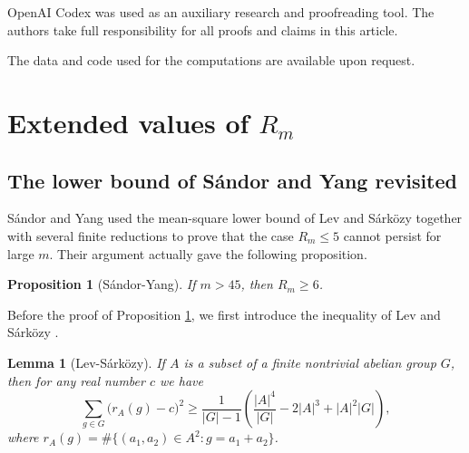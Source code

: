 \documentclass[12pt,a4paper,reqno]{amsart}
\numberwithin{equation}{section}
\theoremstyle{plain}
\newtheorem{lemma}{Lemma}
\newtheorem{proposition}{Proposition}
\theoremstyle{definition}
\begin{document}
OpenAI Codex was used as an auxiliary research and proofreading tool. 
The authors take full responsibility for all proofs and claims in this article.

The data and code used for the computations are available upon request. 

\section{Extended values of \texorpdfstring{$R_m$}{Rm}}

\subsection{The lower bound of S\'andor and Yang revisited}
S\'andor and Yang \cite{SY17} used the mean-square lower bound of
Lev and S\'ark\"ozy \cite{LevSarkozy} together with several finite
reductions to prove that the case \(R_m\le 5\) cannot persist for large
\(m\). Their argument actually gave the following proposition.

\begin{proposition}[S\'andor-Yang]\label{proposition-Sandor-Yang}
If \(m>45\), then \(R_m\ge 6\).
\end{proposition}

Before the proof of Proposition \ref{proposition-Sandor-Yang}, we first introduce the inequality of Lev and S\'ark\"ozy \cite{LevSarkozy}.

\begin{lemma}[Lev-S\'ark\"ozy]\label{lem-L-S}
If $A$ is a subset of a finite
nontrivial abelian group $G$, then for any real number $c$ we have
$$
\sum_{g\in G}\big(r_A(g)-c\big)^2\ge \frac{1}{|G|-1}\left(\frac{|A|^4}{|G|}-2|A|^3+|A|^2|G|\right),
$$
where $r_A(g)=\#\big\{(a_1,a_2)\in A^2: g=a_1+a_2\big\}$.
\end{lemma}
\end{document}
